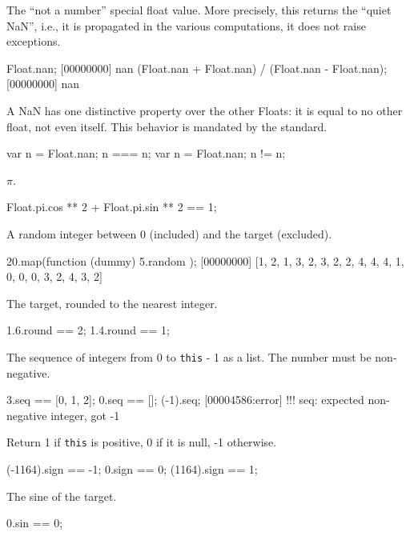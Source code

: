 \begin{urbiscriptapi}
\item[nan]
  The ``not a number'' special float value.  More precisely, this
  returns the ``quiet NaN'', i.e., it is propagated in the various
  computations, it does not raise exceptions.
\begin{urbiscript}
Float.nan;
[00000000] nan
(Float.nan + Float.nan) / (Float.nan - Float.nan);
[00000000] nan
\end{urbiscript}

A {NaN} has one distinctive property over the other Floats: it is
equal to no other float, not even itself.  This behavior is mandated
by the  standard.
\begin{urbiassert}
{ var n = Float.nan; n === n};
{ var n = Float.nan; n  != n};
\end{urbiassert}

\item[pi]
  $\pi$.
\begin{urbiassert}
Float.pi.cos ** 2 + Float.pi.sin ** 2 == 1;
\end{urbiassert}

\item[random]
  A random integer between 0 (included) and the target (excluded).
\begin{urbiscript}
20.map(function (dummy) { 5.random });
[00000000] [1, 2, 1, 3, 2, 3, 2, 2, 4, 4, 4, 1, 0, 0, 0, 3, 2, 4, 3, 2]
\end{urbiscript}

\item[round]
  The target, rounded to the nearest integer.
\begin{urbiassert}
1.6.round == 2;
1.4.round == 1;
\end{urbiassert}

\item[seq]
  The sequence of integers from 0 to \lstinline|this| - 1 as a list.
  The number must be non-negative.
\begin{urbiassert}
3.seq == [0, 1, 2];
0.seq == [];
(-1).seq;
[00004586:error] !!! seq: expected non-negative integer, got -1
\end{urbiassert}

\item[sign]
  Return 1 if \lstinline|this| is positive, 0 if it is null, -1
  otherwise.
\begin{urbiassert}
(-1164).sign == -1;
0.sign       == 0;
(1164).sign  == 1;
\end{urbiassert}

\item[sin]
  The sine of the target.
\begin{urbiassert}
0.sin == 0;
\end{urbiassert}


\end{urbiscriptapi}
